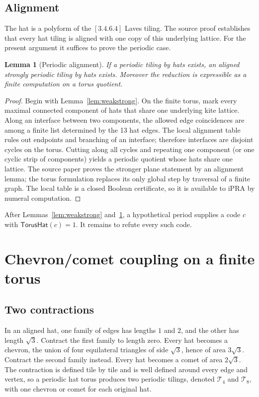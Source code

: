 \documentclass[11pt]{article}
\newtheorem{lemma}[theorem]{Lemma}
\newcommand{\iPRA}{\mathrm{iPRA}}
\begin{document}
\subsection{Alignment}
The hat is a polyform of the $[3.4.6.4]$ Laves tiling.  The source proof establishes that
every hat tiling is aligned with one copy of this underlying lattice.  For the present
argument it suffices to prove the periodic case.

\begin{lemma}[Periodic alignment]\label{lem:alignment}
If a periodic tiling by hats exists, an aligned strongly periodic tiling by hats exists.
Moreover the reduction is expressible as a finite computation on a torus quotient.
\end{lemma}

\begin{proof}
Begin with Lemma~\ref{lem:weakstrong}.  On the finite torus, mark every maximal connected
component of hats that share one underlying kite lattice.  Along an interface between two
components, the allowed edge coincidences are among a finite list determined by the 13
hat edges.  The local alignment table rules out endpoints and branching of an interface;
therefore interfaces are disjoint cycles on the torus.  Cutting along all cycles and
repeating one component (or one cyclic strip of components) yields a periodic quotient
whose hats share one lattice.  The source paper proves the stronger plane statement by
an alignment lemma; the torus formulation replaces its only global step by traversal of
a finite graph.  The local table is a closed Boolean certificate, so it is available to
$\iPRA$ by numeral computation.
\end{proof}

After Lemmas~\ref{lem:weakstrong} and~\ref{lem:alignment}, a hypothetical period supplies a
code $c$ with $\mathsf{TorusHat}(c)=1$.  It remains to refute every such code.

\section{Chevron/comet coupling on a finite torus}\label{sec:coupling}

\subsection{Two contractions}
In an aligned hat, one family of edges has lengths $1$ and $2$, and the other has length
$\sqrt3$.  Contract the first family to length zero.  Every hat becomes a chevron, the
union of four equilateral triangles of side $\sqrt3$, hence of area $3\sqrt3$.  Contract
the second family instead.  Every hat becomes a comet of area $2\sqrt3$.  The contraction
is defined tile by tile and is well defined around every edge and vertex, so a periodic
hat torus produces two periodic tilings, denoted $\mathcal T_4$ and $\mathcal T_8$, with
one chevron or comet for each original hat.
\end{document}
